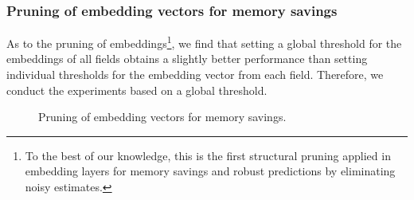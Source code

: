 \documentclass[sigconf]{acmart}
\begin{document}
\subsubsection{\textbf{Pruning of embedding vectors for memory savings}}
As to the pruning of embeddings\footnote{To the best of our knowledge, this is the first structural pruning applied in embedding layers for memory savings and robust predictions by eliminating noisy estimates.}, we find that setting a global threshold for the embeddings of all fields obtains a slightly better performance than setting individual thresholds for the embedding vector from each field. Therefore, we conduct the experiments based on a global threshold. 

\begin{figure}[h!]
\centering
\vspace{-0.1in}
  \label{fig: fm2a} 
  \label{fig: avazu_2b}
   \vspace{-0.05in}
  \caption{Pruning of embedding vectors for memory savings.}
  \label{prune_fig_emb}
\end{figure}
\end{document}
